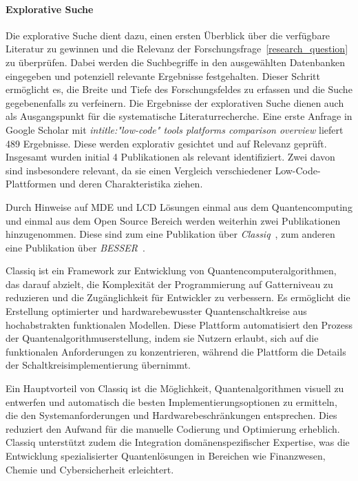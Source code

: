 \paragraph{Explorative Suche}
Die explorative Suche dient dazu, einen ersten Überblick über die verfügbare Literatur zu gewinnen und 
die Relevanz der Forschungsfrage~\ref{research_question} zu überprüfen. Dabei werden die Suchbegriffe in den ausgewählten 
Datenbanken eingegeben und potenziell relevante Ergebnisse festgehalten. Dieser Schritt ermöglicht es, 
die Breite und Tiefe des Forschungsfeldes zu erfassen und die Suche gegebenenfalls zu verfeinern. 
Die Ergebnisse der explorativen Suche dienen auch als Ausgangspunkt für die systematische Literaturrecherche. 
Eine erste Anfrage in Google Scholar mit \textit{intitle:"low-code" tools platforms comparison overview} liefert 489 
Ergebnisse. Diese werden explorativ gesichtet und auf Relevanz geprüft. Insgesamt wurden initial 4 Publikationen 
als relevant identifiziert. Zwei davon sind insbesondere relevant, da sie einen Vergleich verschiedener 
Low-Code-Plattformen und deren Charakteristika ziehen. 

Durch Hinweise auf MDE und LCD Lösungen einmal aus dem Quantencomputing und einmal aus dem Open Source Bereich werden 
weiterhin zwei Publikationen hinzugenommen. Diese sind zum eine Publikation über \textit{Classiq}~\cite{minerbi2022quantum}, zum anderen 
eine Publikation über \textit{BESSER}~\cite{alfonso2024building}. 

Classiq ist ein Framework zur Entwicklung von Quantencomputeralgorithmen, das darauf abzielt, die Komplexität der Programmierung 
auf Gatterniveau zu reduzieren und die Zugänglichkeit für Entwickler zu verbessern. Es ermöglicht die Erstellung optimierter und 
hardwarebewusster Quantenschaltkreise aus hochabstrakten funktionalen Modellen. Diese Plattform automatisiert den Prozess der 
Quantenalgorithmuserstellung, indem sie Nutzern erlaubt, sich auf die funktionalen Anforderungen zu konzentrieren, während die 
Plattform die Details der Schaltkreisimplementierung übernimmt.

Ein Hauptvorteil von Classiq ist die Möglichkeit, Quantenalgorithmen visuell zu entwerfen und automatisch die besten Implementierungsoptionen 
zu ermitteln, die den Systemanforderungen und Hardwarebeschränkungen entsprechen. Dies reduziert den Aufwand für die manuelle Codierung und 
Optimierung erheblich. Classiq unterstützt zudem die Integration domänenspezifischer Expertise, was die Entwicklung spezialisierter 
Quantenlösungen in Bereichen wie Finanzwesen, Chemie und Cybersicherheit erleichtert.

